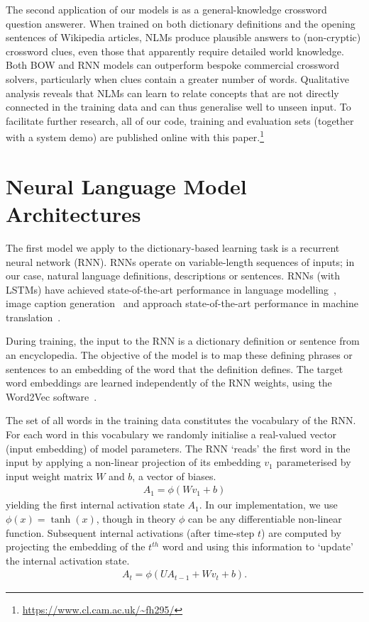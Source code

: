 The second application of our models is as a general-knowledge crossword question answerer. When trained on both dictionary definitions and the opening sentences of Wikipedia articles, NLMs produce plausible answers to (non-cryptic) crossword clues, even those that apparently require detailed world knowledge. Both BOW and RNN models can outperform bespoke commercial crossword solvers, particularly when clues contain a greater number of words. Qualitative analysis reveals that NLMs can learn to relate concepts that are not directly connected in the training data and can thus generalise well to unseen input. To facilitate further research, all of our code, training and evaluation sets (together with a system demo) are published online with this paper.\footnote{
    \url{https://www.cl.cam.ac.uk/~fh295/}
}

\section{Neural Language Model Architectures}

The first model we apply to the dictionary-based learning task is a recurrent neural network (RNN). RNNs operate on variable-length sequences of inputs; in our case, natural language definitions, descriptions or sentences. RNNs (with LSTMs) have achieved state-of-the-art performance in language modelling~\cite{mikolov2010recurrent}, image caption generation~\cite{kiros2014unifying} and approach state-of-the-art performance in machine translation~\cite{bahdanau2014neural}. 

During training, the input to the RNN is a dictionary definition or sentence from an encyclopedia. The objective of the model is to map these defining phrases or sentences to an embedding of the word that the definition defines. The target word embeddings are learned independently of the RNN weights, using the Word2Vec software~\cite{mikolov2013distributed}.   

The set of all words in the training data constitutes the vocabulary of the RNN. For each word in this vocabulary we randomly initialise a real-valued vector (input embedding) of model parameters. The RNN `reads' the first word in the input by applying a non-linear projection of its embedding \(v_1\) parameterised by input weight matrix \(W\) and \(b\), a vector of biases.
\begin{align*}
A_1 = \phi( Wv_1 + b) 
\end{align*}
yielding the first internal activation state \(A_1\). In our implementation, we
use \(\phi(x) = \tanh(x)\), though in theory \(\phi\) can be any differentiable
non-linear function. Subsequent internal activations (after time-step \(t\))
are computed by projecting the embedding of the \(t^{th}\) word and using this
information to `update' the internal activation state. 
\begin{align*}
A_t =  \phi( UA_{t-1} + Wv_t + b ). 
\end{align*}

